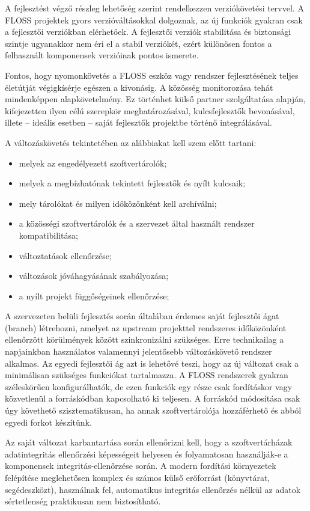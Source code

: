 \documentclass[12pt,magyar,a4paper,oneside]{scrreprt}
\providecommand{\tightlist}{%
  \setlength{\itemsep}{0pt}\setlength{\parskip}{0pt}}
\begin{document}
A fejlesztést végző részleg lehetőség szerint rendelkezzen
verziókövetési tervvel. A FLOSS projektek gyors verzióváltásokkal
dolgoznak, az új funkciók gyakran csak a fejlesztői verziókban
elérhetőek. A fejlesztői verziók stabilitása és biztonsági szintje
ugyanakkor nem éri el a stabil verziókét, ezért különösen fontos a
felhasznált komponensek verzióinak pontos ismerete.

Fontos, hogy nyomonkövetés a FLOSS eszköz vagy rendszer fejlesztésének
teljes életútját végigkísérje egészen a kivonásig. A közösség
monitorozása tehát mindenképpen alapkövetelmény. Ez történhet külső
partner szolgáltatása alapján, kifejezetten ilyen célú szerepkör
meghatározásával, kulcsfejlesztők bevonásával, illete -- ideális esetben
-- saját fejlesztők projektbe történő integrálásával.

A változáskövetés tekintetében az alábbiakat kell szem előtt tartani:

\begin{itemize}
\tightlist
\item
  melyek az engedélyezett szoftvertárolók;
\item
  melyek a megbízhatónak tekintett fejlesztők és nyílt kulcsaik;
\item
  mely tárolókat és milyen időközönként kell archíválni;
\item
  a közösségi szoftvertárolók és a szervezet által használt rendszer
  kompatibilitása;
\item
  változtatások ellenőrzése;
\item
  változások jóváhagyásának szabályozása;
\item
  a nyílt projekt függőségeinek ellenőrzése;
\end{itemize}

A szervezeten belüli fejlesztés során általában érdemes saját fejlesztői
ágat (branch) létrehozni, amelyet az upstream projekttel rendszeres
időközönként ellenőrzött körülmények között szinkronizálni szükséges.
Erre technikailag a napjainkban használatos valamennyi jelentősebb
változáskövető rendszer alkalmas. Az egyedi fejlesztői ág azt is
lehetővé teszi, hogy az új változat csak a minimálisan szükséges
funkciókat tartalmazza. A FLOSS rendszerek gyakran széleskörűen
konfigurálhatók, de ezen funkciók egy része csak fordításkor vagy
közvetlenül a forráskódban kapcsolható ki teljesen. A forráskód
módosítása csak úgy követhető szisztematikusan, ha annak
szoftvertárolója hozzáférhető és abból egyedi forkot készítünk.

Az saját változat karbantartása során ellenőrizni kell, hogy a
szoftvertárházak adatintegritás ellenőrzési képességeit helyesen és
folyamatosan használják-e a komponensek integritás-ellenőrzése során. A
modern fordítási környezetek felépítése meglehetősen komplex és számos
külső erőforrást (könyvtárat, segédeszközt), használnak fel, automatikus
integritás ellenőrzés nélkül az adatok sértetlenség praktikusan nem
biztosítható.
\end{document}
